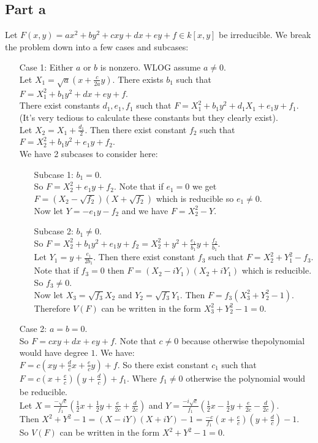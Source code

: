 \documentclass[12pt]{article}
\begin{document}
\subsection*{Part a}
Let $F(x,y)=ax^2+by^2+cxy+dx+ey+f \in k[x,y]$ be irreducible. We break the problem down into a few cases and subcases:
\begin{enumerate}
\item[Case 1:] Either $a$ or $b$ is nonzero. WLOG assume $a \not= 0$. \\
Let $X_1=\sqrt{a}(x+\frac{c}{2a}y)$. There exists $b_1$ such that $F=X_1^2+b_1y^2+dx+ey+f$. \\
There exist constants $d_1,e_1,f_1$ such that
$F=X_1^2+b_1y^2+d_1X_1+e_1y+f_1$. (It's very tedious to calculate these constants but they clearly exist).
\\
Let $X_2=X_1+\frac{d_1}{2}$. Then there exist constant $f_2$ such that
$F=X_2^2+b_1y^2+e_1y+f_2$. \\
We have 2 subcases to consider here:
\begin{enumerate}
\item[Subcase 1:] $b_1=0$. \\
So $F=X_2^2+e_1y+f_2$. Note that if $e_1=0$ we get
$F=(X_2-\sqrt{f_2})(X+\sqrt{f_2})$ which is reducible so $e_1 \not=0$. \\
Now let $Y=-e_1y-f_2$ and we have
$F=X_2^2-Y$.
\item[Subcase 2:] $b_1 \not=0$. \\
So $F=X_2^2+b_1y^2+e_1y+f_2=X_2^2+y^2+\frac{e_1}{b_1}y+\frac{f_2}{b_1}$. \\
Let $Y_1=y+\frac{e_1}{2b_1}$. Then there exist constant $f_3$ such that
$F=X_2^2+Y_1^2-f_3$. Note that if $f_3=0$ then
$F=(X_2-iY_1)(X_2+iY_1)$ which is reducible. So $f_3 \not=0$. \\
Now let $X_3=\sqrt{f_3}X_2$ and $Y_2=\sqrt{f_3}Y_1$. Then $F=f_3(X_3^2+Y_2^2-1)$. Therefore $V(F)$ can be written in the form $X_3^2+Y_2^2-1=0$.
\end{enumerate}
\item[Case 2:] $a=b=0$. \\
So $F=cxy+dx+ey+f$. Note that $c \not=0$ because otherwise thepolynomial would have degree $1$.
We have: \\
$F=c(xy+\frac{d}{c}x+\frac{e}{c}y)+f$. So there exist constant $c_1$ such that
$F=c(x+\frac{e}{c})(y+\frac{d}{c})+f_1$. Where $f_1 \not=0$ otherwise the polynomial would be reducible. \\

Let $X=\frac{-\sqrt{c}}{f_1}(\frac{1}{2}x+\frac{1}{2}y+\frac{e}{2c}+\frac{d}{2c})$ and 
$Y=\frac{-i \sqrt{c}}{f_1}(\frac{1}{2}x-\frac{1}{2}y+\frac{e}{2c}-\frac{d}{2c})$.\\ 
Then $X^2+Y^2-1=(X-iY)(X+iY)-1=\frac{-c}{f_1}(x+\frac{e}{c})(y+\frac{d}{c})-1$. \\
So $V(F)$  can be written in the form $X^2+Y^2-1=0$.


\end{enumerate}
\end{document}
